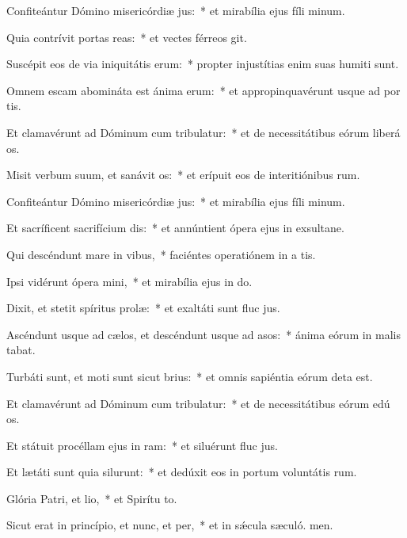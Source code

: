 \item Confiteántur Dómino misericórdiæ jus:~* et mirabília ejus fíli minum.
\item Quia contrívit portas reas:~* et vectes férreos git.
\item Suscépit eos de via iniquitátis erum:~* propter injustítias enim suas humiti sunt.
\item Omnem escam abomináta est ánima erum:~* et appropinquavérunt usque ad por tis.
\item Et clamavérunt ad Dóminum cum tribulatur:~* et de necessitátibus eórum liberá os.
\item Misit verbum suum, et sanávit os:~* et erípuit eos de interitiónibus rum.
\item Confiteántur Dómino misericórdiæ jus:~* et mirabília ejus fíli minum.
\item Et sacríficent sacrifícium dis:~* et annúntient ópera ejus in exsultane.
\item Qui descéndunt mare in vibus,~* faciéntes operatiónem in a tis.
\item Ipsi vidérunt ópera mini,~* et mirabília ejus in do.
\item Dixit, et stetit spíritus prolæ:~* et exaltáti sunt fluc jus.
\item Ascéndunt usque ad cælos, et descéndunt usque ad asos:~* ánima eórum in malis tabat.
\item Turbáti sunt, et moti sunt sicut brius:~* et omnis sapiéntia eórum deta est.
\item Et clamavérunt ad Dóminum cum tribulatur:~* et de necessitátibus eórum edú os.
\item Et státuit procéllam ejus in ram:~* et siluérunt fluc jus.
\item Et lætáti sunt quia silurunt:~* et dedúxit eos in portum voluntátis rum.
\item Glória Patri, et lio,~* et Spirítu to.
\item Sicut erat in princípio, et nunc, et per,~* et in sǽcula sæculó. men.
